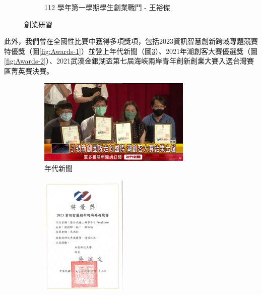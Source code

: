 \begin{figure}[H]
\begin{subfigure}{0.32\linewidth}
    \caption{112 學年第一學期學生創業戰鬥 - 王裕傑}
    \label{fig:Training-3}
  \end{subfigure}
  \caption{創業研習}
  \label{fig:Training}
\end{figure}

此外，我們曾在全國性比賽中獲得多項獎項，包括2023資訊智慧創新跨域專題競賽特優獎（圖\ref{fig:Awards-1}）並登上年代新聞（圖\ref{fig:News}）、2021年潮創客大賽優選獎（圖\ref{fig:Awards-2}）、2021武漢金銀湖盃第七屆海峽兩岸青年創新創業大賽入選台灣賽區菁英賽決賽。

\begin{figure}[H]
  \centering
  \begin{subfigure}{0.32\linewidth}
    \centering
    \includegraphics[width=0.8\textwidth]{images/年代新聞.jpg}
    \caption{年代新聞}
    \label{fig:News}
  \end{subfigure}
    \begin{subfigure}{0.31\linewidth}
    \centering
    \includegraphics[width=0.45\textwidth]{images/ProgLearn.jpg}

\end{subfigure}
\end{figure}
